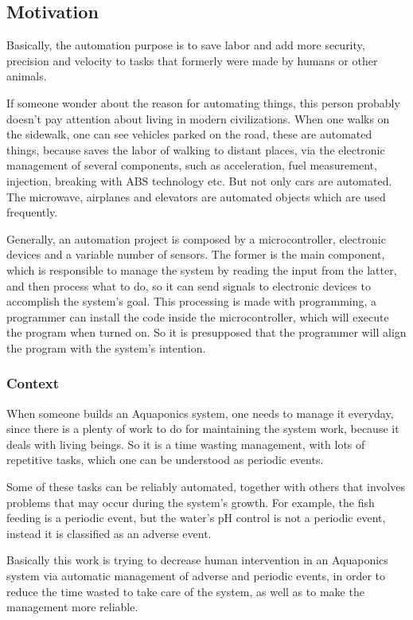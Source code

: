 \subsection{Motivation}
Basically,
the automation purpose is to save labor and add more security,
precision and velocity to tasks that formerly were made by humans or other animals.

If someone wonder about the reason for automating things,
this person probably doesn't pay attention about living in modern civilizations.
When one walks on the sidewalk,
one can see vehicles parked on the road,
these are automated things,
because saves the labor of walking to distant places,
via the electronic management of several components,
such as acceleration,
fuel measurement,
injection,
breaking with ABS technology etc.
But not only cars are automated.
The microwave,
airplanes and elevators are automated objects which are used frequently.

Generally, 
an automation project is composed by a microcontroller, 
electronic devices and a variable number of sensors.
The former is the main component,
which is responsible to manage the system by reading the input from the latter,
and then process what to do,
so it can send signals to electronic devices to accomplish the system's goal.
This processing is made with programming,
a programmer can install the code inside the microcontroller,
which will execute the program when turned on.
So it is presupposed that the programmer will align the program with the system's intention.

\subsubsection{Context}
When someone builds an Aquaponics system,
one needs to manage it everyday,
since there is a plenty of work to do for maintaining the system work,
because it deals with living beings.
So it is a time wasting management,
with lots of repetitive tasks,
which one can be understood as periodic events.

Some of these tasks can be reliably automated,
together with others that involves problems that may occur during the system's growth.
For example, the fish feeding is a periodic event,
but the water's pH control is not a periodic event,
instead it is classified as an adverse event.

Basically this work is trying to decrease human intervention in an Aquaponics system via automatic management of adverse and periodic events,
in order to reduce the time wasted to take care of the system, 
as well as to make the management more reliable.


